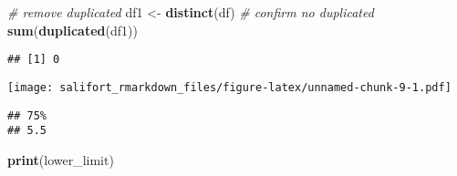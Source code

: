 \documentclass[
]{article}
\newenvironment{Shaded}{\begin{snugshade}}{\end{snugshade}}
\newcommand{\AttributeTok}[1]{\textcolor[rgb]{0.13,0.29,0.53}{#1}}
\newcommand{\CommentTok}[1]{\textcolor[rgb]{0.56,0.35,0.01}{\textit{#1}}}
\newcommand{\FloatTok}[1]{\textcolor[rgb]{0.00,0.00,0.81}{#1}}
\newcommand{\FunctionTok}[1]{\textcolor[rgb]{0.13,0.29,0.53}{\textbf{#1}}}
\newcommand{\NormalTok}[1]{#1}
\newcommand{\OtherTok}[1]{\textcolor[rgb]{0.56,0.35,0.01}{#1}}
\newcommand{\SpecialCharTok}[1]{\textcolor[rgb]{0.81,0.36,0.00}{\textbf{#1}}}
\begin{document}
\begin{Shaded}
\begin{Highlighting}[]
\CommentTok{\# remove duplicated}
\NormalTok{df1 }\OtherTok{\textless{}{-}} \FunctionTok{distinct}\NormalTok{(df)}
\CommentTok{\# confirm no duplicated}
\FunctionTok{sum}\NormalTok{(}\FunctionTok{duplicated}\NormalTok{(df1))}
\end{Highlighting}
\end{Shaded}

\begin{verbatim}
## [1] 0
\end{verbatim}

\begin{Shaded}
\end{Shaded}

\texttt{[image: salifort\_rmarkdown\_files/figure-latex/unnamed-chunk-9-1.pdf]}

\begin{Shaded}
\end{Shaded}

\begin{verbatim}
## 75% 
## 5.5
\end{verbatim}

\begin{Shaded}
\begin{Highlighting}[]
\FunctionTok{print}\NormalTok{(lower\_limit)}
\end{Highlighting}
\end{Shaded}
\end{document}
